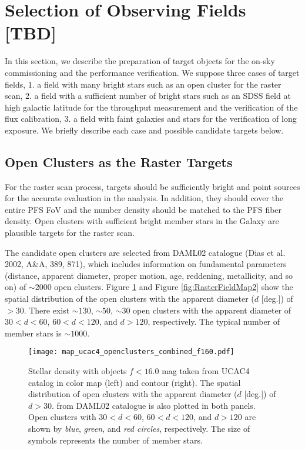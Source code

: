 \section{Selection of Observing Fields [TBD]\label{sec:RasterField}}

In this section, we describe the preparation of target objects for the on-sky commissioning and the performance verification. We suppose three cases of target fields, 1. a field with many bright stars such as an open cluster for the raster scan, 2. a field with a sufficient number of bright stars such as an SDSS field at high galactic latitude for the throughput measurement and the verification of the flux calibration, 3. a field with faint galaxies and stars for the verification of long exposure. We briefly describe each case and possible candidate targets below.

\subsection{Open Clusters as the Raster Targets}
For the raster scan process, targets should be sufficiently bright and point sources for the accurate evaluation in the analysis. In addition, they should cover the entire PFS FoV and the number density should be matched to the PFS fiber density. Open clusters with sufficient bright member stars in the Galaxy are plausible targets for the raster scan. 

The candidate open clusters are selected from DAML02 catalogue (Dias et al. 2002, A\&A, 389, 871), which includes information on fundamental parameters (distance, apparent diameter, proper motion, age, reddening, metallicity, and so on) of $\sim2000$ open clusters.  Figure \ref{fig:RasterFieldMap1} and Figure \ref{fig:RasterFieldMap2} show the spatial distribution of the open clusters with the apparent diameter ($d$ [deg.]) of $>30$. There exist $\sim130$, $\sim50$, $\sim30$ open clusters with the apparent diameter of $30<d<60$, $60<d<120$, and $d>120$, respectively. The typical number of member stars is $\sim1000$. 

\begin{figure}[!ht]
\begin{center}
\texttt{[image: map\_ucac4\_openclusters\_combined\_f160.pdf]}
\end{center}
\caption{Stellar density with objects $f<16.0$ mag taken from UCAC4 catalog in color map (left) and contour (right). The spatial distribution of open clusters with the apparent diameter ($d$ [deg.]) of $d>30$. from DAML02 catalogue is also plotted in both panels. Open clusters with $30<d<60$, $60<d<120$, and $d>120$ are shown by \textit{blue}, \textit{green}, and \textit{red circles}, respectively. The size of symbols represents the number of member stars.
}
\label{fig:RasterFieldMap1}
\end{figure}


